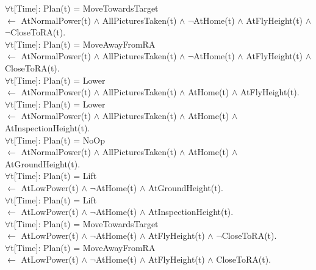 \documentclass{article}
\begin{document}
\begin{landscape}
$\forall$t[Time]: Plan(t) = MoveTowardsTarget 	\\ \indent$\leftarrow$ AtNormalPower(t) $\wedge$  AllPicturesTaken(t) $\wedge$ $\neg$AtHome(t) $\wedge$ AtFlyHeight(t) $\wedge$ $\neg$CloseToRA(t).\vspace{2mm}\\
$\forall$t[Time]: Plan(t) = MoveAwayFromRA	 	\\ \indent$\leftarrow$ AtNormalPower(t) $\wedge$  AllPicturesTaken(t) $\wedge$ $\neg$AtHome(t) $\wedge$ AtFlyHeight(t) $\wedge$ CloseToRA(t).\vspace{2mm}\\
$\forall$t[Time]: Plan(t) = Lower 				\\ \indent$\leftarrow$ AtNormalPower(t) $\wedge$  AllPicturesTaken(t) $\wedge$  AtHome(t) $\wedge$ AtFlyHeight(t).
\newline\\
$\forall$t[Time]: Plan(t) = Lower 				\\ \indent$\leftarrow$ AtNormalPower(t) $\wedge$  AllPicturesTaken(t) $\wedge$  AtHome(t) $\wedge$ AtInspectionHeight(t).\vspace{2mm}\\
$\forall$t[Time]: Plan(t) = NoOp 				\\ \indent$\leftarrow$ AtNormalPower(t) $\wedge$  AllPicturesTaken(t) $\wedge$  AtHome(t) $\wedge$ AtGroundHeight(t).\vspace{2mm}\\
$\forall$t[Time]: Plan(t) = Lift				\\ \indent$\leftarrow$ AtLowPower(t) $\wedge$ $\neg$AtHome(t) $\wedge$ AtGroundHeight(t).\vspace{2mm}\\
$\forall$t[Time]: Plan(t) = Lift				\\ \indent$\leftarrow$ AtLowPower(t) $\wedge$ $\neg$AtHome(t) $\wedge$ AtInspectionHeight(t).\vspace{2mm}\\
$\forall$t[Time]: Plan(t) = MoveTowardsTarget	\\ \indent$\leftarrow$ AtLowPower(t) $\wedge$ $\neg$AtHome(t) $\wedge$ AtFlyHeight(t) $\wedge$ $\neg$CloseToRA(t).\vspace{2mm}\\
$\forall$t[Time]: Plan(t) = MoveAwayFromRA		\\ \indent$\leftarrow$ AtLowPower(t) $\wedge$ $\neg$AtHome(t) $\wedge$ AtFlyHeight(t) $\wedge$ CloseToRA(t).\vspace{2mm}\\

\end{landscape}
\end{document}
